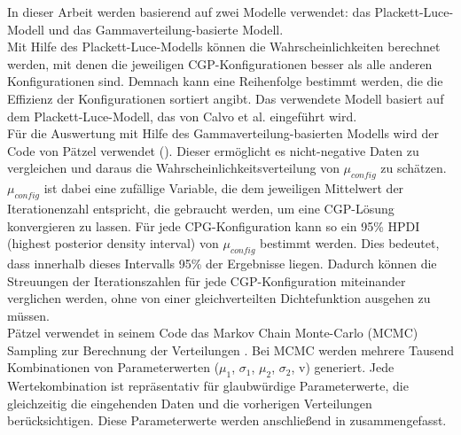 In dieser Arbeit werden basierend auf \cite{cui_equidistant_2023} zwei Modelle verwendet: das Plackett-Luce-Modell und das Gammaverteilung-basierte Modell.\\
Mit Hilfe des Plackett-Luce-Modells können die Wahrscheinlichkeiten berechnet werden, mit denen die jeweiligen CGP-Konfigurationen besser als alle anderen Konfigurationen sind.
Demnach kann eine Reihenfolge bestimmt werden, die die Effizienz der Konfigurationen sortiert angibt.
Das verwendete Modell basiert auf dem Plackett-Luce-Modell, das von Calvo et al. eingeführt wird. \cite{cui_equidistant_2023, calvo_plackett_luce}\\
Für die Auswertung mit Hilfe des Gammaverteilung-basierten Modells wird der Code von Pätzel verwendet (\cite{patzel_dpaetzelcmpbayes_2024}). 
Dieser ermöglicht es nicht-negative Daten zu vergleichen und daraus die Wahrscheinlichkeitsverteilung von $\mu_{config}$ zu schätzen.
$\mu_{config}$ ist dabei eine zufällige Variable, die dem jeweiligen Mittelwert der Iterationenzahl entspricht, die gebraucht werden, um eine CGP-Lösung konvergieren zu lassen.
Für jede CPG-Konfiguration kann so ein 95\% HPDI (highest posterior density interval) von $\mu_{config}$ bestimmt werden.
Dies bedeutet, dass innerhalb dieses Intervalls 95\% der Ergebnisse liegen. \cite{cui_equidistant_2023}
Dadurch können die Streuungen der Iterationszahlen für jede CGP-Konfiguration miteinander verglichen werden, ohne von einer gleichverteilten Dichtefunktion ausgehen zu müssen.\\

Pätzel verwendet in seinem Code das Markov Chain Monte-Carlo (MCMC) Sampling zur Berechnung der Verteilungen \cite{patzel_dpaetzelcmpbayes_2024, cui_equidistant_2023}.
Bei MCMC werden mehrere Tausend Kombinationen von Parameterwerten ($\mu_1$, $\sigma_1$, $\mu_2$, $\sigma_2$, v) generiert.
Jede Wertekombination ist repräsentativ für glaubwürdige Parameterwerte, die gleichzeitig die eingehenden Daten und die vorherigen Verteilungen berücksichtigen.
Diese Parameterwerte werden anschließend in zusammengefasst. \cite{kruschke_bayesian_estimation}

